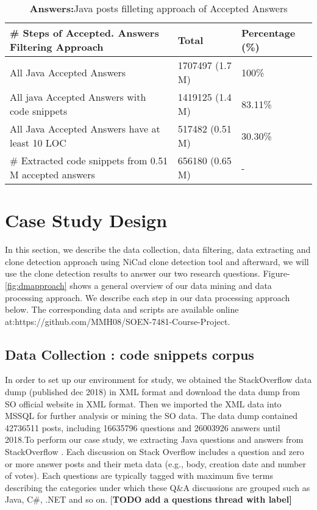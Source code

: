 \documentclass[conference]{IEEEtran}
\begin{document}
	
	\begin{table*}[ht]
		\caption{\textbf{Answers:}Java posts filleting approach of Accepted Answers}
		\centering
		\begin{tabular}{l l l }
			\hline\hline
			\# Steps of Accepted. Answers Filtering Approach & Total & Percentage (\%) \\ [0.5ex]
			\hline
			All Java Accepted Answers & 1707497 (1.7 M) & 100\% \\
			All java Accepted Answers with code snippets & 1419125 (1.4 M) & 83.11\% \\
			All Java Accepted Answers have at least 10 LOC  & 517482 (0.51 M) & 30.30\% \\
			\# Extracted code snippets from 0.51 M accepted answers & 656180 (0.65 M) & - \\  [1ex]
			\hline
		\end{tabular}
		\label{table:JavaAnswers}
	\end{table*}
	
	\section{Case Study Design}
	In this section, we describe the data collection, data filtering, data extracting and clone detection approach using NiCad clone detection tool and afterward, we will use the clone detection results to answer our two research questions. Figure-\ref{fig:dmapproach} shows a general overview of our data mining and data processing approach. We describe each step in our data processing approach below. The corresponding data and scripts are available online at:https://github.com/MMH08/SOEN-7481-Course-Project.	

	
	
	\subsection{Data Collection : code snippets corpus}
	In order to set up our environment for study, we obtained the StackOverflow data dump  (published dec 2018) in XML format and download the data dump from SO official website in XML format. Then we imported the XML data into MSSQL for further analysis or mining the SO data. The data dump contained 42736511 posts, including 16635796 questions and 26003926 answers until 2018.To perform our case study, we extracting Java questions and answers from StackOverflow . Each discussion on Stack Overflow includes a question and zero or more answer posts and their meta data (e.g., body, creation date and number of votes). Each questions are typically tagged with maximum five terms describing the categories under which these Q\&A discussions are grouped such as Java, C\#, .NET and so on. [\textbf{TODO add a questions thread with label]}
	
\end{document}

